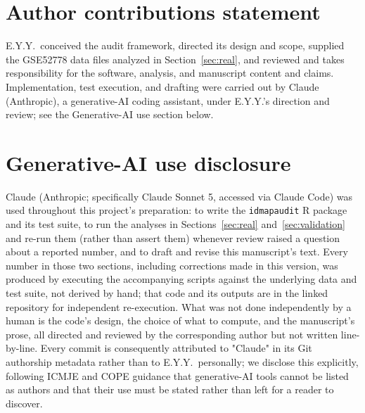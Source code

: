 \documentclass[webpdf,contemporary,large]{oup-authoring-template}
\theoremstyle{thmstyleone}%
\theoremstyle{thmstyletwo}%
\theoremstyle{thmstylethree}%
\begin{document}
\section{Author contributions statement}
E.Y.Y.\ conceived the audit framework, directed its design and scope, supplied the GSE52778 data files analyzed in Section~\ref{sec:real}, and reviewed and takes responsibility for the software, analysis, and manuscript content and claims. Implementation, test execution, and drafting were carried out by Claude (Anthropic), a generative-AI coding assistant, under E.Y.Y.'s direction and review; see the Generative-AI use section below.

\section{Generative-AI use disclosure}
Claude (Anthropic; specifically Claude Sonnet 5, accessed via Claude Code) was used throughout this project's preparation: to write the \texttt{idmapaudit} R package and its test suite, to run the analyses in Sections~\ref{sec:real} and~\ref{sec:validation} and re-run them (rather than assert them) whenever review raised a question about a reported number, and to draft and revise this manuscript's text. Every number in those two sections, including corrections made in this version, was produced by executing the accompanying scripts against the underlying data and test suite, not derived by hand; that code and its outputs are in the linked repository for independent re-execution. What was not done independently by a human is the code's design, the choice of what to compute, and the manuscript's prose, all directed and reviewed by the corresponding author but not written line-by-line. Every commit is consequently attributed to "Claude" in its Git authorship metadata rather than to E.Y.Y.\ personally; we disclose this explicitly, following ICMJE and COPE guidance that generative-AI tools cannot be listed as authors and that their use must be stated rather than left for a reader to discover.



\end{document}
